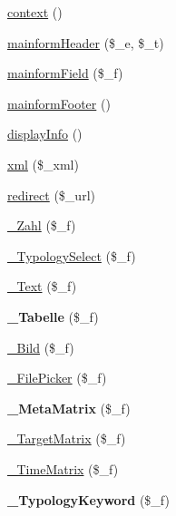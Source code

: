 \begin{DoxyCompactItemize}
\hyperlink{classrokfor___t_e_m_p_l_a_t_e_s_a23a1f7bd41068b622c4015f5654ee3f3}{context} ()
\item 
\hyperlink{classrokfor___t_e_m_p_l_a_t_e_s_a10bc4379f999a676d121f56df7edf004}{mainform\-Header} (\$\-\_\-e, \$\-\_\-t)
\item 
\hyperlink{classrokfor___t_e_m_p_l_a_t_e_s_ae07a60d46fd7e92778da8fce07ae7894}{mainform\-Field} (\$\-\_\-f)
\item 
\hyperlink{classrokfor___t_e_m_p_l_a_t_e_s_a63bee8411eb29d85739d6d57c0caad94}{mainform\-Footer} ()
\item 
\hyperlink{classrokfor___t_e_m_p_l_a_t_e_s_a9efeaab6638e0a5844b184f2d4926816}{display\-Info} ()
\item 
\hyperlink{classrokfor___t_e_m_p_l_a_t_e_s_a143e5e8c60e5535631a4f5248185e357}{xml} (\$\-\_\-xml)
\item 
\hyperlink{classrokfor___t_e_m_p_l_a_t_e_s_a9a29c4a6bcb1467bfe39cd05f1ff1fd0}{redirect} (\$\-\_\-url)
\item 
\hyperlink{classrokfor___t_e_m_p_l_a_t_e_s_a57b901bb1487455d7cf6cac2786ed5e7}{\-\_\-\-Zahl} (\$\-\_\-f)
\item 
\hyperlink{classrokfor___t_e_m_p_l_a_t_e_s_adb93037deadd7b37fb1b8b88a1e7decc}{\-\_\-\-Typology\-Select} (\$\-\_\-f)
\item 
\hyperlink{classrokfor___t_e_m_p_l_a_t_e_s_af60d3ddc8d268a47d0d1e2ae250eb310}{\-\_\-\-Text} (\$\-\_\-f)
\item 
\hypertarget{classrokfor___t_e_m_p_l_a_t_e_s_a641ee0dfd81a89cfff3dba5ca49ce4f2}{
{\bfseries \-\_\-\-Tabelle} (\$\-\_\-f)}
\label{classrokfor___t_e_m_p_l_a_t_e_s_a641ee0dfd81a89cfff3dba5ca49ce4f2}

\item 
\hyperlink{classrokfor___t_e_m_p_l_a_t_e_s_a00aecd55263469a61b0ae567e7dbabb5}{\-\_\-\-Bild} (\$\-\_\-f)
\item 
\hyperlink{classrokfor___t_e_m_p_l_a_t_e_s_a677f8889c474c05cd859e80c0f833409}{\-\_\-\-File\-Picker} (\$\-\_\-f)
\item 
\hypertarget{classrokfor___t_e_m_p_l_a_t_e_s_aea6bafe550e2d8895afde7734f4d5c04}{
{\bfseries \-\_\-\-Meta\-Matrix} (\$\-\_\-f)}
\label{classrokfor___t_e_m_p_l_a_t_e_s_aea6bafe550e2d8895afde7734f4d5c04}

\item 
\hyperlink{classrokfor___t_e_m_p_l_a_t_e_s_ae6820b626b29e5dabe5cc388c0f4702c}{\-\_\-\-Target\-Matrix} (\$\-\_\-f)
\item 
\hyperlink{classrokfor___t_e_m_p_l_a_t_e_s_a7717bcd23a746112c9402f5fef75ee16}{\-\_\-\-Time\-Matrix} (\$\-\_\-f)
\item 
\hypertarget{classrokfor___t_e_m_p_l_a_t_e_s_a2fab5e597ab2b1b2ea45ea74e3f6f2a5}{
{\bfseries \-\_\-\-Typology\-Keyword} (\$\-\_\-f)}
\label{classrokfor___t_e_m_p_l_a_t_e_s_a2fab5e597ab2b1b2ea45ea74e3f6f2a5}


\end{DoxyCompactItemize}
